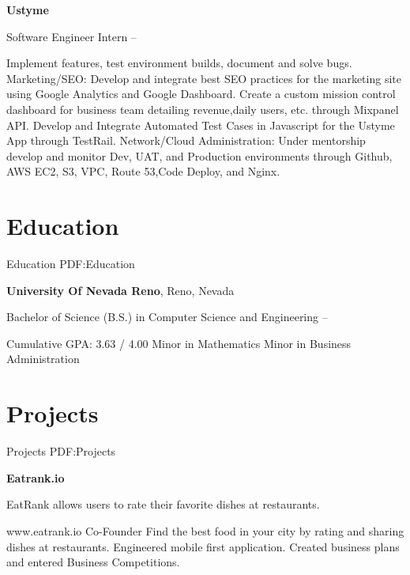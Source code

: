 \documentclass[a4paper,10pt,oneside]{article}
\begin{document}
\begin{body}
\EntryGap

{\textbf{Ustyme}}
\par
Software Engineer Intern
\hfill
{} --
\begin{detail}
\BulletItem
Implement features, test environment builds, document and solve bugs.
\BulletItem
Marketing/SEO: 
Develop and integrate best SEO practices for the marketing site \newline using Google Analytics and Google Dashboard.
\BulletItem
Create a custom mission control dashboard for business team detailing revenue,\newline daily users, etc. through Mixpanel API.
\BulletItem
Develop and Integrate Automated Test Cases in Javascript for the Ustyme App \newline through TestRail.
\BulletItem
Network/Cloud Administration:
Under mentorship develop and monitor Dev, \newline UAT, and Production environments through Github, AWS EC2, S3, VPC, Route 53,\newline Code Deploy, and Nginx.
\end{detail}


\section
{Education}
{Education}
{PDF:Education}

{\textbf{University Of Nevada Reno}},
Reno, Nevada
\par
Bachelor of Science (B.S.) in 
{Computer Science and Engineering}
\hfill
{} --
\begin{detail}
\BulletItem
Cumulative GPA: 3.63 / 4.00
\BulletItem
Minor in 
{Mathematics}
\BulletItem
Minor in
{Business Administration}
\end{detail}

\section
{Projects\newline}
{Projects}
{PDF:Projects}

\textbf{Eatrank.io}\par
EatRank allows users to rate their favorite dishes at restaurants.
\begin{detail}
\BulletItem
www.eatrank.io
\BulletItem
Co-Founder
\BulletItem
Find the best food in your city by rating and sharing dishes at restaurants.
\BulletItem
Engineered mobile first application.
\BulletItem
Created business plans and entered Business Competitions.
\end{detail}


\end{body}
\end{document}
